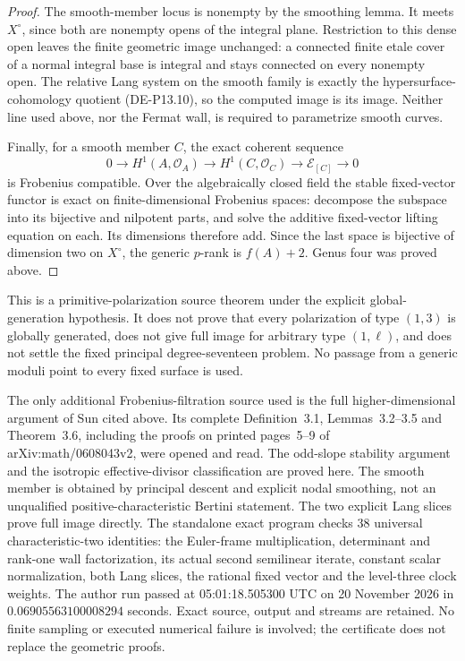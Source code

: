 \begin{proof}
The smooth-member locus is nonempty by the smoothing lemma.
It meets \(X^\circ\), since both are nonempty opens of the
integral plane. Restriction to this dense open leaves the finite
geometric image unchanged: a connected finite etale cover of a
normal integral base is integral and stays connected on every
nonempty open. The relative Lang system on the smooth family
is exactly the hypersurface-cohomology quotient (DE-P13.10),
so the computed image is its image. Neither line used above,
nor the Fermat wall, is required to parametrize smooth curves.

Finally, for a smooth member \(C\), the exact coherent sequence
\[
 0\longrightarrow H^1(A,\mathcal O_A)
  \longrightarrow H^1(C,\mathcal O_C)
  \longrightarrow\mathcal E_{[C]}\longrightarrow0
\]
is Frobenius compatible. Over the algebraically closed field the
stable fixed-vector functor is exact on finite-dimensional
Frobenius spaces: decompose the subspace into its bijective and
nilpotent parts, and solve the additive fixed-vector lifting
equation on each. Its dimensions therefore add. Since the last
space is bijective of dimension two on \(X^\circ\), the
generic \(p\)-rank is \(f(A)+2\). Genus four was proved above.
\end{proof}

\begin{remark}
\label{rem:DE-primitive-one-three-scope}
This is a primitive-polarization source theorem under the explicit
global-generation hypothesis. It does not prove that every
polarization of type \((1,3)\) is globally generated, does not
give full image for arbitrary type \((1,\ell)\), and does not
settle the fixed principal degree-seventeen problem. No passage
from a generic moduli point to every fixed surface is used.

The only additional Frobenius-filtration source used is the full
higher-dimensional argument of Sun cited above. Its complete
Definition~3.1, Lemmas~3.2--3.5 and Theorem~3.6, including the
proofs on printed pages~5--9 of arXiv:math/0608043v2, were opened
and read. The odd-slope stability argument and the isotropic
effective-divisor classification are proved here. The smooth
member is obtained by principal descent and explicit nodal
smoothing, not an unqualified positive-characteristic Bertini
statement. The two explicit Lang slices prove full image directly.
The standalone exact program
checks 38 universal characteristic-two identities: the Euler-frame
multiplication, determinant and rank-one wall factorization, its
actual second semilinear iterate, constant scalar normalization,
both Lang slices, the rational fixed vector and the level-three
clock weights. The author run passed at 05:01:18.505300 UTC on
20 November 2026 in \(0.06905563100008294\) seconds. Exact
source, output and streams are retained. No finite sampling or
executed numerical failure is involved; the certificate does not
replace the geometric proofs.
\end{remark}
